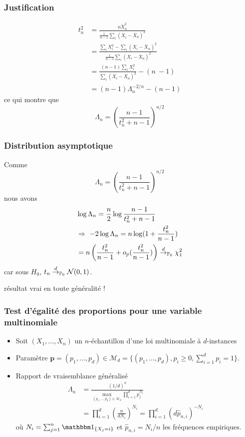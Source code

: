 \begin{frame}
\frametitle{Justification}
\begin{align*}
t_{n}^{2} &=\frac{n\overline{X}_{n}^{2}}{\frac{1}{n-1}\sum_{i}(X_{i}-\overline{X}_{n})^{2}} \\
&=\frac{\sum_{i}X_{i}^{2}-\sum_{i}(X_{i}-\overline{X}_{n})^{2}}{\frac{1}{n-1}\sum_{i}(X_{i}-\overline{X}_{n})^{2}} \\
&=\frac{(n-1)\sum_{i}X_{i}^{2}}{\sum_{i}(X_{i}-\overline{X}_{n})^{2}}-(n\ -1) \\
&=(n-1)\Lambda_{n}^{-2/n}-(n-1)
\end{align*}
ce qui montre que
$$
\Lambda_{n}=(\frac{n-1}{t_{n}^{2}+n-1})^{n/2}
$$
\end{frame}

\begin{frame}
\frametitle{Distribution asymptotique}
Comme
$$
\Lambda_{n}=(\frac{n-1}{t_{n}^{2}+n-1})^{n/2}
$$
nous avons
\begin{align*}
&\log\Lambda_{n}=\frac{n}{2}\log\frac{n-1}{t_{n}^{2}+n-1} \\
&\Rightarrow \ -2\log\Lambda_{n}=n\log(1+\frac{t_{n}^{2}}{n-1}) \\
&=n \left(\frac{t_{n}^{2}}{n-1}+o_{p}(\frac{t_{n}^{2}}{n-1}) \right) \stackrel{d}{\rightarrow}_{\operatorname{{\mathbb P}}_0} \chi_{1}^{2}
\end{align*}
car sous $H_{0}$,  $t_{n} \stackrel{d}{\rightarrow}_{\operatorname{{\mathbb P}}_0} \mathcal{N}(0,1)$.

\bigskip

\alert{résultat vrai en toute généralité !}
\end{frame}


\begin{frame}
\frametitle{Test d'égalité des proportions pour une variable multinomiale}
\begin{itemize}
\item Soit $(X_1,\dots,X_n)$ un $n$-échantillon d'une loi multinomiale à $d$-instances
\item \alert{Paramètre} $\mathbf{p}= (p_1,\dots,p_d) \in \mathcal{M}_d= \{ (p_1, \dots, p_d), p_i \geq 0, \sum_{i=1}^d p_i =1 \}$.
\item \alert{Rapport de vraisemblance généralisé}
\alert{
\begin{align*}
\Lambda_n 
&= \frac{(1/d)^n}{\max_{(p_1,\dots,p_k) \in \mathcal{M}_d} \prod_{i=1}^d p_j^{N_i} } \\
&= \prod_{i=1}^d \left( \frac{n}{d N_i} \right)^{N_i} = \prod_{i=1}^d (d \hat{p}_{n,i})^{-N_i}
\end{align*}
}
où $N_i= \sum_{j=1}^n \indi{X_j=i}$  et $\hat{p}_{n,i}= N_i/n$ les fréquences empiriques. 
\end{itemize}
\end{frame}

